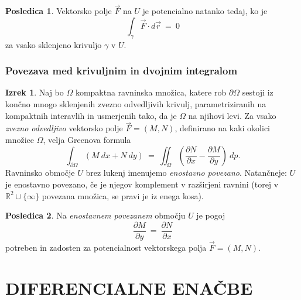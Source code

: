 \documentclass[11pt]{article}
\theoremstyle{definition}
\theoremstyle{definition}
\theoremstyle{definition}
\newtheorem{izrek}{Izrek}[section]
\newtheorem*{posledica}{Posledica}
\begin{document}
\begin{posledica}

Vektorsko polje $\vec{F}$ na $U$ je potencialno natanko tedaj, ko je 
$$\int_{\gamma} \vec{F} \cdot d\vec{r} ~=~ 0$$
za vsako sklenjeno krivuljo $\gamma$ v $U$.

\end{posledica}
\vspace{0.5cm}

\subsubsection{Povezava med krivuljnim in dvojnim integralom}

\begin{izrek}

Naj bo $\Omega$ kompaktna ravninska množica, katere rob $\partial \Omega$ sestoji iz končno mnogo sklenjenih zvezno odvedljivih krivulj, parametriziranih na kompaktnih interavlih in usmerjenih tako, da je $\Omega$ na njihovi levi. Za vsako \textit{zvezno odvedljivo} vektorsko polje $\vec{F} = (M, N)$, definirano na kaki okolici množice $\Omega$, velja Greenova formula
$$\int_{\partial \Omega} (M~dx + N~dy) ~=~ \iint_{\Omega} \left( \frac{\partial N}{\partial x} - \frac{\partial M}{\partial y} \right)~dp.$$
Ravninsko območje $U$ brez lukenj imenujemo \textit{enostavno povezano}. Natančneje: $U$ je enostavno povezano, če je njegov komplement v razširjeni ravnini (torej v $\mathbb{R}^2 \cup \{\infty\}$ povezana množica, se pravi je iz enega kosa).

\end{izrek}
\vspace{0.5cm}

\begin{posledica}

Na \textit{enostavnem povezanem} območju $U$ je pogoj 
$$\frac{\partial M}{\partial y} ~=~ \frac{\partial N}{\partial x}$$
potreben in zadosten za potencialnost vektorskega polja $\vec{F} = (M, N)$.

\end{posledica}
\vspace{0.5cm}


\pagebreak


\section{DIFERENCIALNE ENAČBE}
\vspace{0.5cm}





\end{document}
